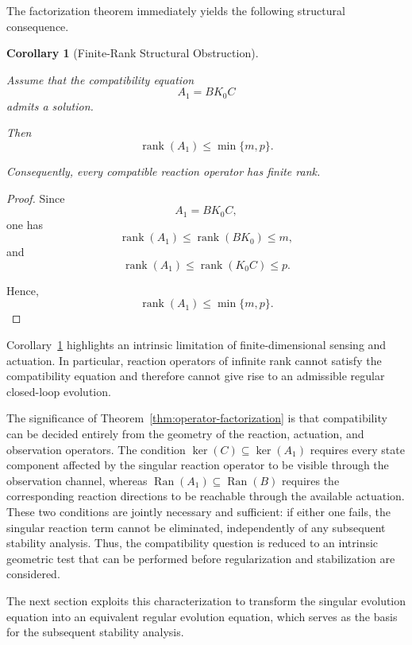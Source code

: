 \documentclass[pdflatex,sn-mathphys-num]{sn-jnl}
\theoremstyle{thmstyleone}%
\theoremstyle{thmstyletwo}%
\theoremstyle{thmstylethree}%
\newtheorem{corollary}{Corollary}
\begin{document}
The factorization theorem immediately yields the following structural consequence.

\begin{corollary}[Finite-Rank Structural Obstruction]
\label{cor:finite-rank}

Assume that the compatibility equation
\[
A_{1}=BK_{0}C
\]
admits a solution.

Then
\[
\operatorname{rank}(A_{1})
\le
\min\{m,p\}.
\]

Consequently, every compatible reaction operator has finite rank.

\end{corollary}

\begin{proof}

Since
\[
A_{1}=BK_{0}C,
\]
one has
\[
\operatorname{rank}(A_{1})
\le
\operatorname{rank}(BK_{0})
\le
m,
\]
and
\[
\operatorname{rank}(A_{1})
\le
\operatorname{rank}(K_{0}C)
\le
p.
\]

Hence,
\[
\operatorname{rank}(A_{1})
\le
\min\{m,p\}.
\]

\end{proof}

Corollary~\ref{cor:finite-rank} highlights an intrinsic limitation of finite-dimensional sensing and actuation. In particular, reaction operators of infinite rank cannot satisfy the compatibility equation and therefore cannot give rise to an admissible regular closed-loop
evolution.

The significance of Theorem~\ref{thm:operator-factorization} is that compatibility can be decided entirely from the geometry of the reaction, actuation, and observation operators. The condition \(\ker(C)\subseteq\ker(A_1)\) requires every state component affected by the singular reaction operator to be visible through the observation channel, whereas \(\operatorname{Ran}(A_1)\subseteq\operatorname{Ran}(B)\) requires the corresponding reaction directions to be reachable through the available actuation. These two conditions are jointly necessary and sufficient: if either one fails, the singular reaction term cannot be eliminated, independently of any subsequent stability analysis. Thus, the compatibility question is reduced to an intrinsic geometric test that can be performed before regularization and stabilization are considered.

The next section exploits this characterization to transform the singular evolution equation into an equivalent regular evolution equation, which serves as the basis for the subsequent stability analysis.
\end{document}

